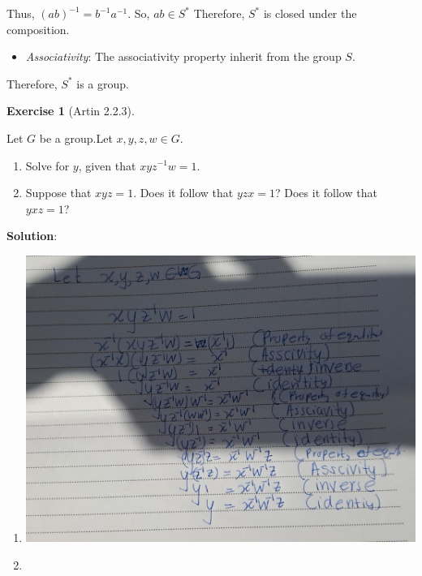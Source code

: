\documentclass[
]{book}
\providecommand{\tightlist}{%
  \setlength{\itemsep}{0pt}\setlength{\parskip}{0pt}}
\theoremstyle{definition}
\theoremstyle{definition}
\theoremstyle{definition}
\newtheorem{exercise}{Exercise}[chapter]
\theoremstyle{definition}
\theoremstyle{remark}
\begin{document}
Thus, \((ab)^{-1}=b^{-1}a^{-1}\). So, \(ab\in S^*\)
Therefore, \(S^*\) is closed under the composition.

\begin{itemize}
\tightlist
\item
  \emph{Associativity}: The associativity property inherit from the group \(S\).
\end{itemize}

Therefore, \(S^*\) is a group.

\begin{exercise}[Artin 2.2.3]
\protect\hypertarget{exr:unnamed-chunk-72}{}\label{exr:unnamed-chunk-72}

Let \(G\) be a group.Let \(x, y, z,w \in G\).

\begin{enumerate}
\def\labelenumi{(\alph{enumi})}
\tightlist
\item
  Solve for \(y\), given that \(xyz^{-1}w = 1\).
\item
  Suppose that \(xyz = 1\). Does it follow that \(yzx = 1\)? Does it follow that \(yxz = 1\)?
\end{enumerate}

\end{exercise}

\textbf{Solution}:

\begin{enumerate}
\def\labelenumi{\alph{enumi}.}
\tightlist
\item
  \hfill\break
  \includegraphics{figures/ch_2/fig17.jpg}
\item
  \hfill\break
\end{enumerate}
\end{document}
